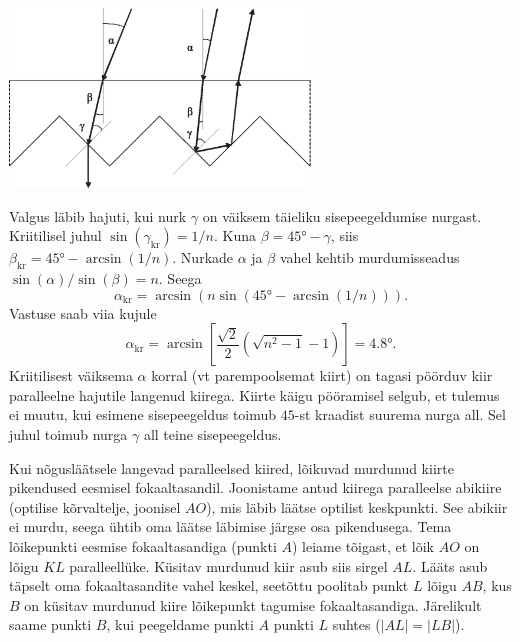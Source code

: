 \documentclass[10pt, twoside]{article}
\begin{document}
{%

\solu
\begin{center}
	\includegraphics[width=0.6\textwidth]{2010-v2g-08-hajuti_lah.eps}
\end{center}

Valgus läbib hajuti, kui nurk $\gamma$ on väiksem täieliku sisepeegeldumise nurgast. Kriitilisel juhul $\sin(\gamma_\mathrm{kr})=1/n$. Kuna $\beta=\ang{45}-\gamma$, siis $\beta_\mathrm{kr} = \ang{45}-\arcsin(1/n)$. Nurkade $\alpha$ ja $\beta$ vahel kehtib murdumisseadus $\sin(\alpha)/\sin(\beta)=n$. Seega
\[
\alpha_\mathrm{kr}=\arcsin(n\sin(\ang{45}-\arcsin(1/n))).
\]
Vastuse saab viia kujule
\[
\alpha_\mathrm{kr}=\arcsin\left[\frac{\sqrt2}{2}(\sqrt{n^2-1}-1)\right] = \ang{4.8}.
\]
Kriitilisest väiksema $\alpha$ korral (vt parempoolsemat kiirt) on tagasi pöörduv kiir paralleelne hajutile langenud kiirega. Kiirte käigu pööramisel selgub, et tulemus ei muutu, kui esimene sisepeegeldus toimub $45$-st kraadist suurema nurga all. Sel juhul toimub nurga $\gamma$ all teine sisepeegeldus.
\probend
\bigskip


\solu
Kui nõgusläätsele langevad paralleelsed kiired, lõikuvad
murdunud kiirte pikendused eesmisel fokaaltasandil. Joonistame antud kiirega paralleelse abikiire (optilise kõrvaltelje, joonisel $AO$), mis läbib läätse optilist keskpunkti. See abikiir ei murdu, seega ühtib oma läätse läbimise järgse osa pikendusega. Tema lõikepunkti eesmise fokaaltasandiga (punkti $A$) leiame tõigast, et lõik $AO$ on lõigu
$KL$ paralleellüke. Küsitav murdunud kiir asub siis sirgel $AL$. Lääts asub täpselt oma
fokaaltasandite vahel keskel, seetõttu poolitab punkt $L$ lõigu $AB$, kus $B$ on küsitav murdunud kiire lõikepunkt tagumise fokaaltasandiga. Järelikult saame punkti $B$, kui peegeldame punkti $A$ punkti $L$ suhtes ($|AL| = |LB|$).

}
\end{document}
